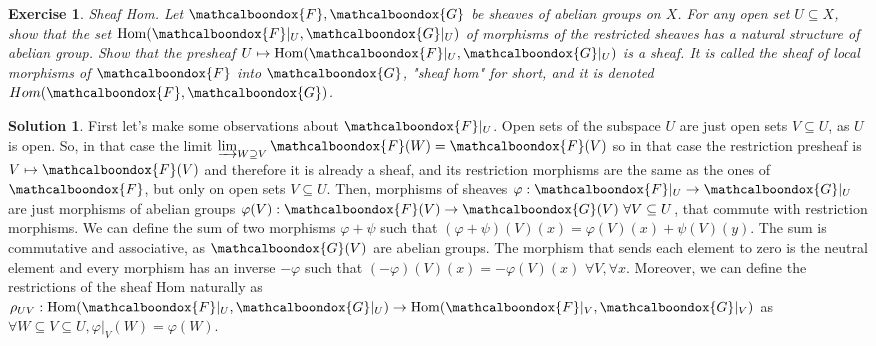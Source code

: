 \documentclass[12pt]{article}
\newtheorem{ex}{Exercise}[section]
\theoremstyle{definition}
\newtheorem*{sol}{Solution}
\newcommand{\sF}{\ensuremath{\mathcalboondox{F}}}
\newcommand{\sG}{\ensuremath{\mathcalboondox{G}}}
\begin{document}
\begin{ex}
	Sheaf Hom. Let $\sF, \sG$ be sheaves of abelian groups on $X$. For any open set $U \subseteq X$, show that the set $\mathrm{Hom}(\sF|_U, \sG|_U)$ of morphisms of the restricted sheaves has a natural structure of abelian group. Show that the presheaf $U \mapsto \mathrm{Hom}(\sF|_U, \sG|_U)$ is a sheaf. It is called the sheaf of local morphisms of $\sF$ into $\sG$, "sheaf hom" for short, and it is denoted $Hom(\sF, \sG)$.
\end{ex}

\begin{sol}
	First let's make some observations about $\sF|_U$. Open sets of the subspace $U$ are just open sets $V \subseteq U$, as $U$ is open. So, in that case the limit $\varinjlim_{W \supseteq V} \sF(W) = \sF(V)$ so in that case the restriction presheaf is $V \mapsto \sF(V)$ and therefore it is already a sheaf, and its restriction morphisms are the same as the ones of $\sF$, but only on open sets $V \subseteq U$. Then, morphisms of sheaves $\varphi: \sF|_U \to \sG|_U$ are just morphisms of abelian groups $\varphi(V): \sF(V) \to \sG(V) \, \, \forall V \subseteq U$, that commute with restriction morphisms. We can define the sum of two morphisms $\varphi + \psi$ such that $(\varphi + \psi)(V)(x) = \varphi(V)(x) + \psi(V)(y)$. The sum is commutative and associative, as $\sG(V)$ are abelian groups. The morphism that sends each element to zero is the neutral element and every morphism has an inverse $-\varphi$ such that $(-\varphi)(V)(x) = -\varphi(V)(x) \, \, \forall V, \forall x$. Moreover, we can define the restrictions of the sheaf Hom naturally as $\rho_{UV}: \mathrm{Hom}(\sF|_U, \sG|_U) \to \mathrm{Hom}(\sF|_V, \sG|_V)$ as $\forall W \subseteq V \subseteq U, \varphi|_V (W) = \varphi(W)$.
\end{sol}
\end{document}
